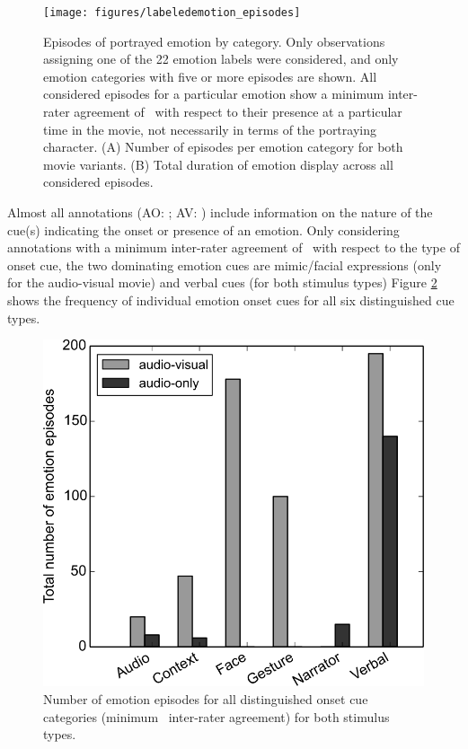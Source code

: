 \begin{figure}
  \centering
  \texttt{[image: figures/labeledemotion\_episodes]}
  \caption{Episodes of portrayed emotion by category. Only observations assigning
    one of the 22 emotion labels were considered, and only emotion categories
    with five or more episodes are shown. All considered episodes for a particular emotion
    show a minimum inter-rater agreement of \AVAggThresh\ with respect to their
    presence at a particular time in the movie, not necessarily in terms of the
    portraying character. (A) Number of episodes
    per emotion category for both movie variants. (B) Total duration of emotion
    display across all considered episodes.}
  \label{fig:threshlabeledemotion}
\end{figure}

Almost all annotations (AO: \AOFracWithLabeledOncue; AV:
\AVFracWithLabeledOncue) include information on the nature of the cue(s)
indicating the onset or presence of an emotion. Only considering annotations
with a minimum inter-rater agreement of \AVAggThresh\ with respect to the type
of onset cue, the two dominating emotion cues are mimic/facial expressions
(only for the audio-visual movie) and verbal cues (for both stimulus types)
Figure \ref{fig:threshlabeledoncue} shows the frequency of individual emotion
onset cues for all six distinguished cue types.


\begin{figure}
  \centering
  \includegraphics[width=\linewidth]{figures/labeledoncue_episodes}
  \caption{Number of emotion episodes for all distinguished onset cue categories
    (minimum \AVAggThresh\ inter-rater agreement) for both stimulus types.}
  \label{fig:threshlabeledoncue}
\end{figure}
